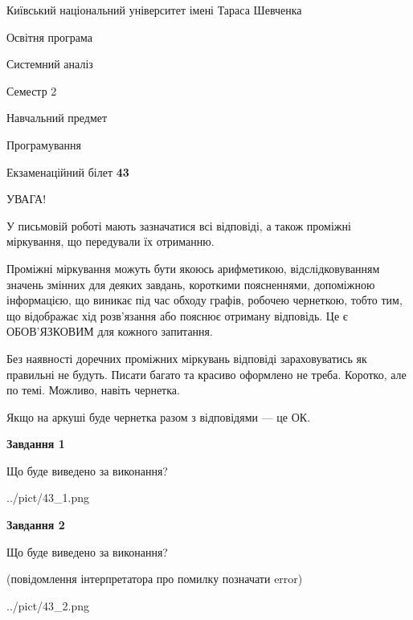 \documentclass[12pt, ukrainian]{article}
\begin{document}
{{\begin {small}\par
{ \center  Київський національний університет імені Тараса Шевченка \par}
{\parbox {5 cm}{Освітня програма \hfill}{\parbox {7 cm}{Системний аналіз \hfill}}\parbox {6 cm}{\hfill Семестр 2}}\par
{\parbox {5 cm} {Навчальний предмет \hfill}\parbox {7 cm}{Програмування \hfill}\parbox {6cm}{\hfill}\par}\vspace{-7pt} \end{small}}{\center Екзаменаційний білет \No \textbf
{ 43 }\par}}
{
\begin {large}
УВАГА!

У письмовій роботі мають зазначатися всі відповіді, а також проміжні міркування, що передували їх отриманню.

Проміжні міркування можуть бути якоюсь арифметикою, відслідковуванням зна\-чень змінних для деяких завдань,
короткими поясненнями, допоміжною інформацією, що виникає під час обходу графів, робочею чернеткою,
тобто тим, що відображає хід розв’язання або пояснює отриману відповідь.
Це є ОБОВ’ЯЗКОВИМ для кожного запитання.

Без наявності доречних проміжних міркувань відповіді зараховуватись як правиль\-ні не будуть.
Писати багато та красиво оформлено не треба. Коротко, але по темі. Можли\-во, навіть чернетка.

Якщо на аркуші буде чернетка разом з відповідями --- це ОК.

\newpage

{\begin {center}\textbf{Завдання 1}\end {center}}\par
Що буде виведено за виконання?\par
\begin{center}
	{../pict/43_1.png}
\end{center}
\newpage

{\begin {center}\textbf{Завдання 2}\end {center}}\par
Що буде виведено за виконання?\par
 (повідомлення інтерпретатора про помилку позначати error)\par
\begin{center}
	{../pict/43_2.png}
\end{center}
\newpage


\end{large}}
\end{document}
